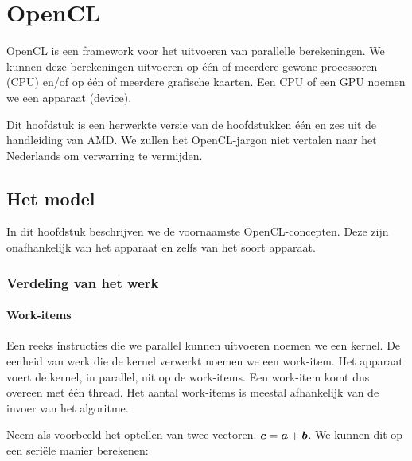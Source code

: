 \chapter{OpenCL}
\label{h:opencl} 
OpenCL is een framework voor het uitvoeren van parallelle berekeningen. We kunnen deze berekeningen uitvoeren op \'e\'en of meerdere gewone processoren (CPU) en/of op \'e\'en of meerdere grafische kaarten. Een CPU of een GPU noemen we een apparaat (device).

Dit hoofdstuk is een herwerkte versie van de hoofdstukken \'e\'en en zes uit de handleiding van AMD\cite{amd}. We zullen het OpenCL-jargon niet vertalen naar het Nederlands om verwarring te vermijden. 


\section{Het model}
In dit hoofdstuk beschrijven we de voornaamste OpenCL-concepten. Deze zijn onafhankelijk van het apparaat en zelfs van het soort apparaat.
\subsection{Verdeling van het werk}
\subsubsection{Work-items}
Een reeks instructies die we parallel kunnen uitvoeren noemen we een kernel. De eenheid van werk die de kernel verwerkt  noemen we een work-item. Het apparaat voert de kernel, in parallel, uit op de work-items. Een work-item komt dus overeen met \'e\'en thread. Het aantal work-items is meestal afhankelijk van de invoer van het algoritme.

Neem als voorbeeld het optellen van twee vectoren. $\boldsymbol{c} = \boldsymbol{a} + \boldsymbol{b}$. We kunnen dit op een seri\"ele manier berekenen:

